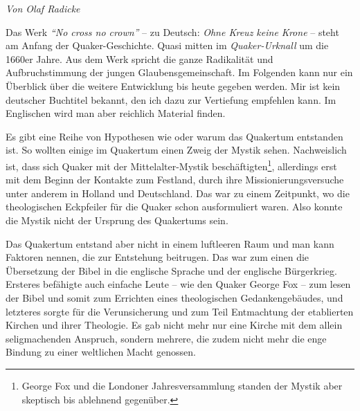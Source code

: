 


\begin{flushright}
\begin{footnotesize}
\textit{Von Olaf Radicke}
\end{footnotesize}
\end{flushright}
\smallskip

Das Werk \textit{"`No cross no crown"'} -- zu Deutsch: \textit{Ohne Kreuz keine
Krone} --
steht am Anfang der Quaker-Geschichte. Quasi mitten im
\textit{Quaker-Urknall}
um die 1660er Jahre. Aus dem Werk spricht die ganze Radikalität und
Aufbruchstimmung der jungen Glaubensgemeinschaft. Im Folgenden kann nur ein
Überblick über die weitere Entwicklung bis heute gegeben werden. Mir ist kein
deutscher Buchtitel bekannt, den ich dazu zur Vertiefung empfehlen kann. Im
Englischen wird man aber reichlich Material finden.

\medskip

Es gibt eine Reihe von Hypothesen wie oder warum das Quakertum
entstanden ist.
So
wollten einige im Quakertum einen Zweig der Mystik sehen.
Nachweislich ist, dass
sich Quaker mit der Mittelalter-Mystik beschäftigten\footnote{George Fox und die
Londoner Jahresversammlung standen der Mystik aber skeptisch bis ablehnend
gegenüber.}, allerdings erst mit dem
Beginn der Kontakte zum Festland, durch ihre Missionierungsversuche unter
anderem in Holland und Deutschland. Das war zu einem Zeitpunkt, wo die
theologischen Eckpfeiler für die Quaker schon ausformuliert waren. Also konnte
die Mystik nicht der Ursprung des Quakertums sein.

\medskip

Das Quakertum entstand aber nicht in einem luftleeren Raum und man kann Faktoren
nennen,
die zur Entstehung beitrugen. Das war zum einen die Übersetzung der Bibel
in die englische Sprache und der englische Bürgerkrieg. Ersteres befähigte auch
einfache Leute -- wie den Quaker George Fox -- zum
lesen der Bibel und somit zum
Errichten eines theologischen Gedankengebäudes, und letzteres sorgte für die
Verunsicherung und zum Teil Entmachtung der etablierten Kirchen und ihrer
Theologie. Es gab nicht mehr nur eine Kirche mit dem allein seligmachenden
Anspruch, sondern mehrere, die zudem nicht mehr die enge Bindung zu einer
weltlichen Macht genossen.

\medskip

